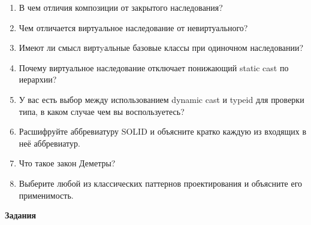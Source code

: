 \documentclass[a4paper,12pt,oneside]{article}
\begin{document}
\begin{enumerate}
\item В чем отличия композиции от закрытого наследования?
\item Чем отличается виртуальное наследование от невиртуального?
\item Имеют ли смысл виртyальные базовые классы при одиночном наследовании?
\item Почему виртуальное наследование отключает понижающий static cast по иерархии?
\item У вас есть выбор между использованием dynamic cast и typeid для проверки типа, в каком случае чем вы воспользуетесь?
\item Расшифруйте аббревиатуру SOLID и объясните кратко каждую из входящих в неё аббревиатур.
\item Что такое закон Деметры?
\item Выберите любой из классических паттернов проектирования и объясните его применимость.
\end{enumerate}

\textbf{Задания}
\end{document}
